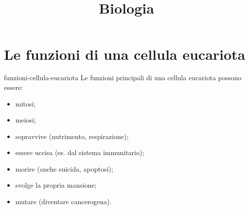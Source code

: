 \documentclass[preview]{standalone}
\begin{document}
\title{Biologia}
\genpage

\section{Le funzioni di una cellula eucariota}

\begin{snippet}{funzioni-cellula-eucariota}
    Le funzioni principali di una cellula eucariota possono essere:

    \begin{itemize}
        \item mitosi;
        \item meiosi;
        \item sopravvive (nutrimento, respirazione);
        \item essere uccisa (es. dal sistema immunitario);
        \item morire (anche suicida, apoptosi);
        \item svolge la propria mansione;
        \item mutare (diventare cancerogena).
    \end{itemize}
\end{snippet}
\end{document}
